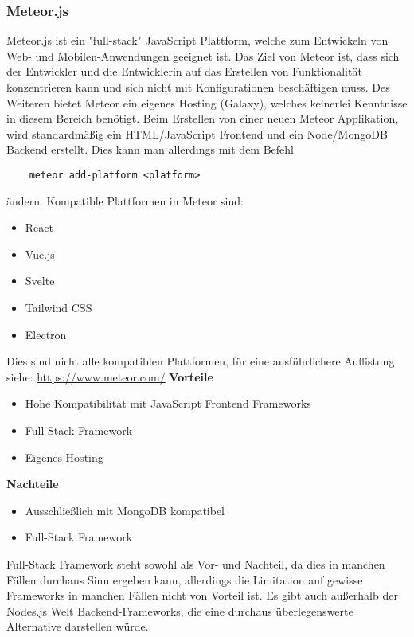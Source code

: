 \subsubsection{Meteor.js}
Meteor.js ist ein "full-stack" JavaScript Plattform, welche zum Entwickeln von Web- und Mobilen-Anwendungen geeignet ist. Das Ziel von Meteor ist, dass sich der Entwickler und die Entwicklerin auf das Erstellen von Funktionalität konzentrieren kann und sich nicht mit Konfigurationen beschäftigen muss. Des Weiteren bietet Meteor ein eigenes Hosting (Galaxy), welches keinerlei Kenntnisse in diesem Bereich benötigt. 
\newline
Beim Erstellen von einer neuen Meteor Applikation, wird standardmäßig ein HTML/JavaScript Frontend und ein Node/MongoDB Backend erstellt. Dies kann man allerdings mit dem Befehl
\begin{verbatim}
    meteor add-platform <platform>
\end{verbatim}
ändern. Kompatible Plattformen in Meteor sind:
\begin{itemize}
    \item React
    \item Vue.js
    \item Svelte
    \item Tailwind CSS
    \item Electron
\end{itemize}
Dies sind nicht alle kompatiblen Plattformen, für eine ausführlichere Auflistung siehe: \url{https://www.meteor.com/}
\newline
\textbf{Vorteile}
\begin{itemize}
    \item Hohe Kompatibilität mit JavaScript Frontend Frameworks
    \item Full-Stack Framework
    \item Eigenes Hosting
\end{itemize}
\textbf{Nachteile}
\begin{itemize}
    \item Ausschließlich mit MongoDB kompatibel
    \item Full-Stack Framework
\end{itemize}
Full-Stack Framework steht sowohl als Vor- und Nachteil, da dies in manchen Fällen durchaus Sinn ergeben kann, allerdings die Limitation auf gewisse Frameworks in manchen Fällen nicht von Vorteil ist.
\cite{backend_meteor}
\cite{backend_meteor_1}
\newline
Es gibt auch außerhalb der Nodes.js Welt Backend-Frameworks, die eine durchaus überlegenswerte Alternative darstellen würde.

